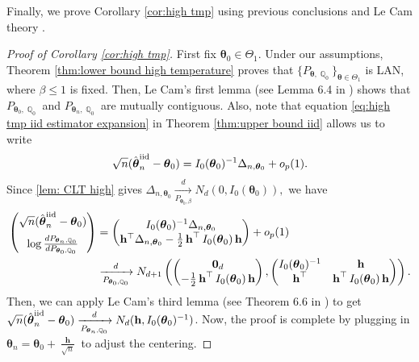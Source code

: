 \documentclass[preprint,reqno]{imsart}
\newcommand{\ttheta}{\boldsymbol{\theta}}
\DeclareMathOperator{\bh}{\textbf{h}}
\DeclareMathOperator{\QQ}{\mathbb{Q}}
\newcommand{\thetaiid}{\hat{\boldsymbol \theta}^{\text{iid}}_{\mathnormal n}}
\begin{document}
Finally, we prove Corollary \ref{cor:high tmp} using previous conclusions and Le Cam theory \citep{van2000asymptotic}.
\begin{proof}[Proof of Corollary \ref{cor:high tmp}]
    First fix $\ttheta_0 \in \Theta_1$. 
    Under our assumptions, Theorem \ref{thm:lower bound high temperature} proves that $\{P_{\ttheta, \QQ_0} \}_{\ttheta\in \Theta_1}$ is LAN, where $\beta \le 1$ is fixed.
    Then, Le Cam's first lemma (see Lemma 6.4 in \cite{van2000asymptotic}) shows that $P_{\ttheta_0,\QQ_0}$ and $P_{\ttheta_n,\QQ_{0}}$ are mutually contiguous.
    Also, note that equation \eqref{eq:high tmp iid estimator expansion} in Theorem \ref{thm:upper bound iid} allows us to write
    $$\sqrt{n}(\thetaiid - \ttheta_0) = I_0(\ttheta_0)^{-1} \Delta_{n,\ttheta_0} + o_p(1).$$
    Since \cref{lem: CLT high} gives $\Delta_{n,\ttheta_0} \xrightarrow[P_{\ttheta_0,\beta}]{d} N_d(0, I_0(\ttheta_0)),$ we have 
    \begin{align}
    \begin{pmatrix}
       \vspace{2mm}
        \sqrt{n}(\thetaiid - \ttheta_0) \\ 
        \log \frac{dP_{\ttheta_n,\QQ_{0}}}{dP_{\ttheta_0, \QQ_0}}
    \end{pmatrix} &= \begin{pmatrix}
        I_0(\ttheta_0)^{-1} \Delta_{n,\ttheta_0} \\
        \mathbf{h}^\top \Delta_{n,\ttheta_0} - \frac{1}{2}\bh^\top I_0(\ttheta_0) \bh
    \end{pmatrix} + o_p(1) \\
    & \xrightarrow[P_{\ttheta_0,\QQ_0}]{d} N_{d+1} \left(\begin{pmatrix}
        \mathbf{0}_d \\ -\frac{1}{2} \bh^\top I_0(\ttheta_0) \bh
    \end{pmatrix}, \begin{pmatrix}
        I_0(\ttheta_0)^{-1} & \bh \\ 
        \bh^\top & \bh^\top I_0(\ttheta_0) \bh
    \end{pmatrix} \right). 
    \end{align}
    Then, we can apply Le Cam's third lemma (see Theorem 6.6 in \cite{van2000asymptotic}) to get $\sqrt{n}(\thetaiid - \ttheta_0) \xrightarrow[P_{\ttheta_n,\QQ_0}]{d} N_d(\bh, I_0(\ttheta_0)^{-1})$. Now, the proof is complete by plugging in $\ttheta_n = \ttheta_0 + \frac{\bh}{\sqrt{n}}$ to adjust the centering.
\end{proof}
\end{document}
